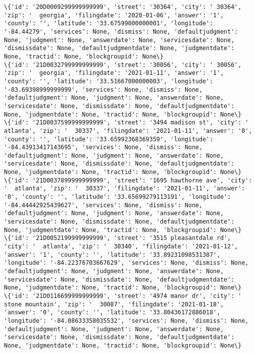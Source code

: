 \documentclass[11pt]{article}
\begin{document}
\begin{Verbatim}[commandchars=\\\{\}]
\{'id': '20D0009299999999999', 'street': '30364', 'city': ' 30364', 'zip': '  georgia', 'filingdate': '2020-01-06', 'answer': '1', 'county': '', 'latitude': '33.67599000000001', 'longitude': '-84.44279', 'services': None, 'dismiss': None, 'defaultjudgment': None, 'judgment': None, 'answerdate': None, 'servicesdate': None, 'dismissdate': None, 'defaultjudgmentdate': None, 'judgmentdate': None, 'tractid': None, 'blockgroupid': None\}
\{'id': '21D0032799999999999', 'street': '30056', 'city': ' 30056', 'zip': '  georgia', 'filingdate': '2021-01-11', 'answer': '1', 'county': '', 'latitude': '33.51667000000003', 'longitude': '-83.69398999999999', 'services': None, 'dismiss': None, 'defaultjudgment': None, 'judgment': None, 'answerdate': None, 'servicesdate': None, 'dismissdate': None, 'defaultjudgmentdate': None, 'judgmentdate': None, 'tractid': None, 'blockgroupid': None\}
\{'id': '21D0037599999999999', 'street': '3494 madison st', 'city': '  atlanta', 'zip': '  30337', 'filingdate': '2021-01-11', 'answer': '0', 'county': '', 'latitude': '33.65992368369359', 'longitude': '-84.43913417143695', 'services': None, 'dismiss': None, 'defaultjudgment': None, 'judgment': None, 'answerdate': None, 'servicesdate': None, 'dismissdate': None, 'defaultjudgmentdate': None, 'judgmentdate': None, 'tractid': None, 'blockgroupid': None\}
\{'id': '21D0037899999999999', 'street': '1695 hawthorne ave', 'city': '  atlanta', 'zip': '  30337', 'filingdate': '2021-01-11', 'answer': '0', 'county': '', 'latitude': '33.65699279113191', 'longitude': '-84.44442925439627', 'services': None, 'dismiss': None, 'defaultjudgment': None, 'judgment': None, 'answerdate': None, 'servicesdate': None, 'dismissdate': None, 'defaultjudgmentdate': None, 'judgmentdate': None, 'tractid': None, 'blockgroupid': None\}
\{'id': '21D0052199999999999', 'street': '3515 pleasantdale rd', 'city': '  atlanta', 'zip': '  30340', 'filingdate': '2021-01-12', 'answer': '1', 'county': '', 'latitude': '33.89231098531387', 'longitude': '-84.22376703667629', 'services': None, 'dismiss': None, 'defaultjudgment': None, 'judgment': None, 'answerdate': None, 'servicesdate': None, 'dismissdate': None, 'defaultjudgmentdate': None, 'judgmentdate': None, 'tractid': None, 'blockgroupid': None\}
\{'id': '21D0116699999999999', 'street': '4974 manor dr', 'city': '  stone mountain', 'zip': '  30087', 'filingdate': '2021-01-18', 'answer': '0', 'county': '', 'latitude': '33.80436172886018', 'longitude': '-84.08633358035532', 'services': None, 'dismiss': None, 'defaultjudgment': None, 'judgment': None, 'answerdate': None, 'servicesdate': None, 'dismissdate': None, 'defaultjudgmentdate': None, 'judgmentdate': None, 'tractid': None, 'blockgroupid': None\}

\end{Verbatim}
\end{document}

